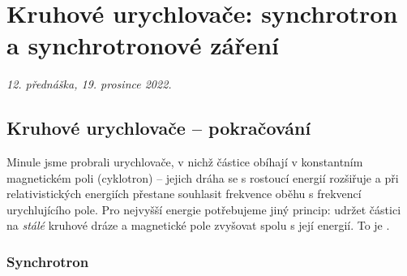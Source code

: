 \section{Kruhové urychlovače: synchrotron a synchrotronové záření}

\emph{12. přednáška, 19. prosince 2022.}

\subsection{Kruhové urychlovače -- pokračování}

Minule jsme probrali urychlovače, v nichž částice obíhají v konstantním
magnetickém poli (cyklotron) -- jejich dráha se s rostoucí energií
rozšiřuje a při relativistických energiích přestane souhlasit frekvence
oběhu s frekvencí urychlujícího pole. Pro nejvyšší energie potřebujeme jiný
princip: udržet částici na \emph{stálé} kruhové dráze a magnetické pole
zvyšovat spolu s její energií. To je .

\subsubsection*{Synchrotron}


